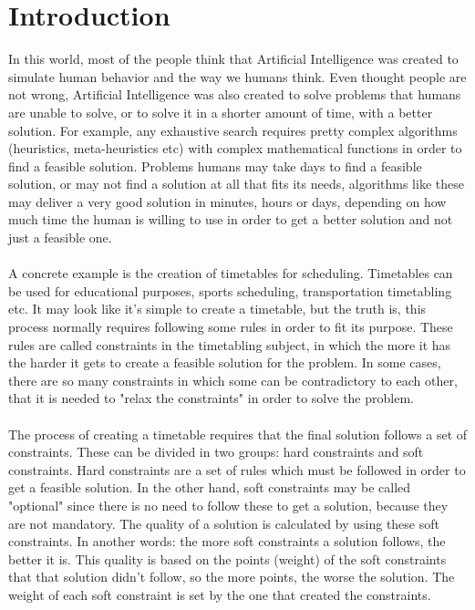 \setcounter{secnumdepth}{3}
\chapter{Introduction}
\label{introduction}
\thispagestyle{plain}

In this world, most of the people think that Artificial Intelligence was created to simulate human behavior and the way we humans think. Even thought people are not wrong, Artificial Intelligence was also created to solve problems that humans are unable to solve, or to solve it in a shorter amount of time, with a better solution. For example, any exhaustive search requires pretty complex algorithms (heuristics, meta-heuristics etc) with complex mathematical functions in order to find a feasible solution. Problems humans may take days to find a feasible solution, or may not find a solution at all that fits its needs, algorithms like these may deliver a very good solution in minutes, hours or days, depending on how much time the human is willing to use in order to get a better solution and not just a feasible one. \\
\\
A concrete example is the creation of timetables for scheduling. Timetables can be used for educational purposes, sports scheduling, transportation timetabling etc. It may look like it's simple to create a timetable, but the truth is, this process normally requires following some rules in order to fit its purpose. These rules are called constraints in the timetabling subject, in which the more it has the harder it gets to create a feasible solution for the problem. In some cases, there are so many constraints in which some can be contradictory to each other, that it is needed to "relax the constraints" in order to solve the problem. \\
\\
The process of creating a timetable requires that the final solution follows a set of constraints. These can be divided in two groups: hard constraints and soft constraints. Hard constraints are a set of rules which must be followed in order to get a feasible solution. In the other hand, soft constraints may be called "optional" since there is no need to follow these to get a solution, because they are not mandatory. The quality of a solution is calculated by using these soft constraints. In another words: the more soft constraints a solution follows, the better it is. This quality is based on the points (weight) of the soft constraints that that solution didn't follow, so the more points, the worse the solution. The weight of each soft constraint is set by the one that created the constraints. \\
